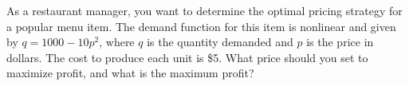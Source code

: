 \documentclass[border=10pt]{standalone}
\begin{document}
\begin{tcolorbox}[
    enhanced,
    colback=yellow!10,
    colframe=orange!50!black,
    boxrule=1pt,
    arc=4mm,
    fontupper=\sffamily\large,
    drop fuzzy shadow=black!50!white
]
As a restaurant manager, you want to determine the optimal pricing strategy for a popular menu item. The demand function for this item is nonlinear and given by $q = 1000 - 10p^2$, where $q$ is the quantity demanded and $p$ is the price in dollars. The cost to produce each unit is \$5. What price should you set to maximize profit, and what is the maximum profit?
\end{tcolorbox}
\end{document}
